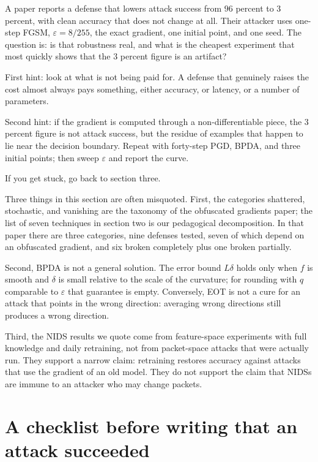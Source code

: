 \begin{tantangan}
A paper reports a defense that lowers attack success from $96$
percent to $3$ percent, with clean accuracy that does not change at all. Their attacker
uses one-step FGSM, $\varepsilon=8/255$, the exact gradient, one initial point,
and one seed. The question is: is that robustness real, and what is the cheapest experiment
that most quickly shows that the $3$ percent figure is an artifact?

First hint: look at what is not being paid for. A defense that genuinely
raises the cost almost always pays something, either accuracy, or latency, or
a number of parameters.

Second hint: if the gradient is computed through a non-differentiable piece, the
$3$ percent figure is not attack success, but the residue of examples that happen to lie
near the decision boundary. Repeat with forty-step PGD, BPDA, and three initial points;
then sweep $\varepsilon$ and report the curve.

If you get stuck, go back to section three.
\end{tantangan}

\begin{untukpeneliti}
Three things in this section are often misquoted. First, the categories shattered, stochastic, and
vanishing are the taxonomy of the obfuscated gradients paper; the list of seven techniques in
section two is our pedagogical decomposition. In that paper there are three categories, nine
defenses tested, seven of which depend on an obfuscated gradient, and
six broken completely plus one broken partially.

Second, BPDA is not a general solution. The error bound $L\delta$ holds only when $f$ is smooth
and $\delta$ is small relative to the scale of the curvature; for rounding with $q$ comparable to
$\varepsilon$ that guarantee is empty. Conversely, EOT is not a cure for an attack that points in
the wrong direction: averaging wrong directions still produces a wrong direction.

Third, the NIDS results we quote come from feature-space experiments with full
knowledge and daily retraining, not from packet-space attacks that were actually run. They
support a narrow claim: retraining restores accuracy against attacks that use
the gradient of an old model. They do not support the claim that NIDSs are immune to an attacker who
may change packets.
\end{untukpeneliti}

\section{A checklist before writing that an attack succeeded}

